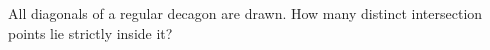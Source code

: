 All diagonals of a regular decagon are drawn. How many distinct intersection points lie strictly inside it?
